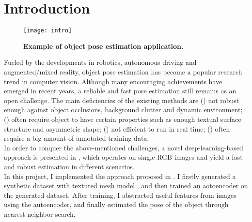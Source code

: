\chapter{Introduction}
\begin{figure}[H]
	\centering
	\texttt{[image: intro]}
	\caption[Example of object pose estimation application.]{\textbf{Example of object pose estimation application.}}
	\label{fig:intro}
\end{figure}

Fueled by the developments in robotics, autonomous driving and augmented/mixed reality, object pose estimation has become a popular research trend in computer vision. Although many encouraging achievements have emerged in recent years, a reliable and fast pose estimation still remains as an open challenge. The main deficiencies of the existing methods are () not robust enough against object occlusions, background clutter and dynamic environment; () often require object to have certain properties such as enough textual surface structure and asymmetric shape; () not efficient to run in real time; () often require a big amount of annotated training data.    
\\[8pt]
In order to conquer the above-mentioned challenges, a novel deep-learning-based approach is presented in \cite{sundermeyer2018implicit}, which operates on single RGB images and yield a fast and robust estimation in different scenarios.
\\[8pt]
In this project, I implemented the approach proposed in \cite{sundermeyer2018implicit}. I firstly generated a synthetic dataset with textured mesh model \cite{calli2015ycb}, and then trained an aotoencoder on the generated dataset. After training, I abstracted useful features from images using the autoencoder, and finally estimated the pose of the object through nearest neighbor search.

